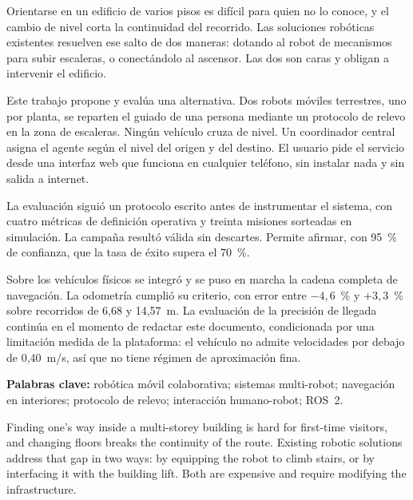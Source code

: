 %

Orientarse en un edificio de varios pisos es difícil para quien no lo conoce, y
el cambio de nivel corta la continuidad del recorrido. Las soluciones robóticas
existentes resuelven ese salto de dos maneras: dotando al robot de mecanismos
para subir escaleras, o conectándolo al ascensor. Las dos son caras y obligan a
intervenir el edificio.

Este trabajo propone y evalúa una alternativa. Dos robots móviles terrestres, uno
por planta, se reparten el guiado de una persona mediante un protocolo de relevo
en la zona de escaleras. Ningún vehículo cruza de nivel. Un coordinador central
asigna el agente según el nivel del origen y del destino. El usuario pide el
servicio desde una interfaz web que funciona en cualquier teléfono, sin instalar
nada y sin salida a internet.

La evaluación siguió un protocolo escrito antes de instrumentar el sistema, con
cuatro métricas de definición operativa y treinta misiones sorteadas en
simulación. La campaña resultó válida sin descartes. Permite afirmar, con 95~\%
de confianza, que la tasa de éxito supera el 70~\%.

Sobre los vehículos físicos se integró y se puso en marcha la cadena completa de
navegación. La odometría cumplió su criterio, con error entre $-4{,}6$~\% y
$+3{,}3$~\% sobre recorridos de 6,68 y 14,57~m. La evaluación de la precisión de
llegada continúa en el momento de redactar este documento, condicionada por una
limitación medida de la plataforma: el vehículo no admite velocidades por debajo
de 0,40~m/s, así que no tiene régimen de aproximación fina.

\vspace{1em}
\textbf{Palabras clave:} robótica móvil colaborativa; sistemas multi-robot;
navegación en interiores; protocolo de relevo; interacción humano-robot; ROS~2.


Finding one's way inside a multi-storey building is hard for first-time
visitors, and changing floors breaks the continuity of the route. Existing
robotic solutions address that gap in two ways: by equipping the robot to climb
stairs, or by interfacing it with the building lift. Both are expensive and
require modifying the infrastructure.

